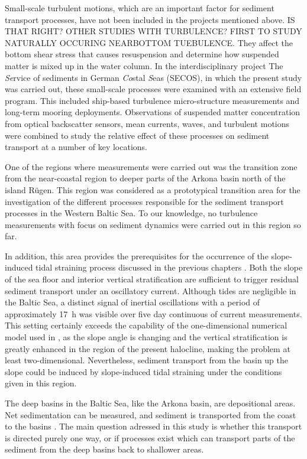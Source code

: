Small-scale turbulent motions, which are an important 
factor for sediment 
transport processes, have not been included in the projects mentioned above. IS 
THAT RIGHT? OTHER STUDIES WITH TURBULENCE? FIRST TO STUDY NATURALLY OCCURING 
NEARBOTTOM TUEBULENCE. 
They affect the bottom shear stress that causes resuspension and determine how 
suspended matter is mixed up in the water column. In the interdisciplinary 
project The \textit{Se}rvice of sediments in German \textit{Co}stal 
\textit{S}eas (SECOS), in which the present study was carried out, these 
small-scale processes were examined with an extensive field program. This 
included ship-based turbulence micro-structure measurements and long-term 
mooring 
deployments. Observations of suspended matter concentration 
from optical backscatter sensors, mean currents, waves, and turbulent 
motions were combined to study the relative effect of these processes on 
sediment transport at a number of key locations.

One of the regions where measurements were carried out was the 
transition zone from the near-coastal region to deeper parts of the Arkona 
basin north of the island 
R\"{u}gen. This region was considered as a prototypical transition area for the 
investigation of the different processes responsible for the sediment transport 
processes in the Western Baltic Sea. To our knowledge, 
no turbulence measurements with focus on sediment dynamics were carried out in 
this region so far.
 
In addition, this area provides the prerequisites for the occurrence of 
the slope-induced tidal straining process discussed in the previous chapters 
\citep[][]{UmlaufBurchard2011a, 
schulzumlauf2016}. Both the slope of the sea floor and 
interior vertical stratification are sufficient to trigger residual sediment 
transport under an oscillatory current. Although tides are negligible in the 
Baltic Sea, a distinct signal of inertial oscillations with a 
period of approximately 17~h was visible over five day continuous of
current measurements. This setting certainly exceeds the capability of the 
one-dimensional numerical model used in \cite{schulzumlauf2016}, as the slope 
angle is changing and the vertical stratification is greatly enhanced in the 
region of the present halocline, making the problem at least two-dimensional. 
Nevertheless, sediment transport from the basin up the slope could be induced 
by slope-induced tidal straining under the conditions given in this region.
 
 The deep basins in the Baltic Sea, like the Arkona basin, are depositional 
areas. Net sedimentation can be measured, and sediment is transported from the 
coast to the basins \citep[][]{basys1, basys2}. The main question adressed in 
this study is whether this transport is directed purely one way, or if processes 
exist which can transport parts of the sediment from the deep basins back to 
shallower areas.

